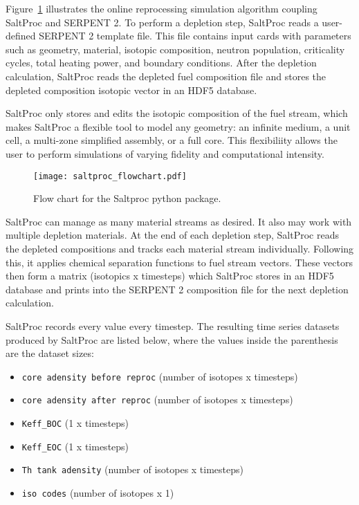 Figure~\ref{fig:saltproc_flow} illustrates the  online reprocessing simulation 
algorithm coupling SaltProc and SERPENT 2. To perform a depletion step, 
SaltProc reads a user-defined SERPENT 2 template file. This file contains input 
cards with parameters such as geometry, material, isotopic composition, neutron 
population, criticality cycles, total heating power, and boundary conditions.  
After the depletion calculation, SaltProc reads the depleted fuel composition 
file and stores the depleted composition isotopic vector in 
an HDF5 database. 

SaltProc only stores and edits the isotopic composition of 
the fuel stream, which makes SaltProc a flexible tool to model any geometry: an 
infinite medium, a unit cell, a multi-zone simplified assembly, or a full core.
This flexibiliity allows the user to perform simulations of varying fidelity 
and computational intensity.

\begin{figure}[ht!] %
  \texttt{[image: saltproc\_flowchart.pdf]}
  \caption{Flow chart for the Saltproc python package.}
  \label{fig:saltproc_flow}
\end{figure}
SaltProc can manage as many material streams as desired. It also may work with 
multiple depletion materials. At the end of each depletion step, SaltProc 
reads the depleted compositions and tracks each material stream individually. 
Following this, it applies chemical separation functions to fuel stream 
vectors. These vectors then form a matrix (isotopics x timesteps) which 
SaltProc stores in an HDF5 database and prints into the SERPENT 2 composition 
file for the next depletion calculation.

SaltProc records every value every timestep. The resulting time series datasets
produced by SaltProc are listed below,
where the values inside the parenthesis are the dataset sizes:

\begin{itemize}
    \item \texttt{core adensity before reproc} (number of isotopes x timesteps)
    \item \texttt{core adensity after reproc} (number of isotopes x timesteps)
    \item \texttt{Keff\_BOC} (1 x timesteps)
    \item \texttt{Keff\_EOC} (1 x timesteps)
    \item \texttt{Th tank adensity} (number of isotopes x timesteps)
    \item \texttt{iso codes} (number of isotopes x 1)
\end{itemize}

